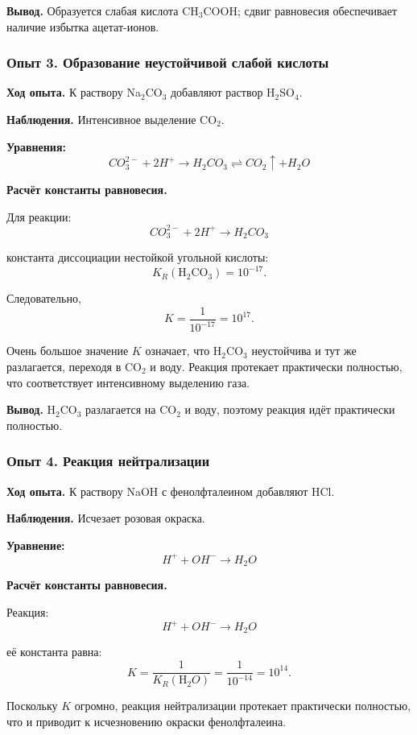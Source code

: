 \documentclass[a4paper,12pt]{article}
\begin{document}
	\textbf{Вывод.}  
	Образуется слабая кислота CH$_3$COOH; сдвиг равновесия обеспечивает наличие избытка ацетат-ионов.

	
	\subsubsection*{Опыт 3. Образование неустойчивой слабой кислоты}
	
	\quad \textbf{ Ход опыта.}  
	К раствору Na$_2$CO$_3$ добавляют раствор H$_2$SO$_4$.
	
	\textbf{Наблюдения.}  
	Интенсивное выделение CO$_2$.
	
	\textbf{Уравнения:}
	\[
	CO_3^{2-} + 2H^+ \rightarrow H_2CO_3 \rightleftharpoons CO_2\uparrow + H_2O
	\]
	
	\textbf{Расчёт константы равновесия.}
	
	Для реакции:
	\[
	CO_3^{2-} + 2H^+ \rightarrow H_2CO_3
	\]
	
	константа диссоциации нестойкой угольной кислоты:
	\[
	K_R(\text{H}_2\text{CO}_3) = 10^{-17}.
	\]
	
	Следовательно,
	\[
	K = \frac{1}{10^{-17}} = 10^{17}.
	\]
	  
	Очень большое значение $K$ означает, что H$_2$CO$_3$ неустойчива и тут же разлагается, переходя в CO$_2$ и воду.  
	Реакция протекает практически полностью, что соответствует интенсивному выделению газа.
	
	\textbf{Вывод.}  
	H$_2$CO$_3$ разлагается на CO$_2$ и воду, поэтому реакция идёт практически полностью.
	
	
	\subsubsection*{Опыт 4. Реакция нейтрализации}
	
	\quad\textbf{ Ход опыта.}  
	К раствору NaOH с фенолфталеином добавляют HCl.
	
	\textbf{Наблюдения.}  
	Исчезает розовая окраска.
	
	\textbf{Уравнение:}
	\[
	H^+ + OH^- \rightarrow H_2O
	\]
	
	\textbf{Расчёт константы равновесия.}
	
	Реакция:
	\[
	H^+ + OH^- \rightarrow H_2O
	\]
	
	её константа равна:
	\[
	K = \frac{1}{K_R(\text{H}_2O)} = \frac{1}{10^{-14}} = 10^{14}.
	\]
	
	\quad Поскольку $K$ огромно, реакция нейтрализации протекает практически полностью, что и приводит к исчезновению окраски фенолфталеина.
	
\end{document}
